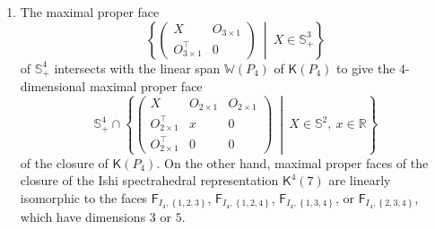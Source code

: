 \documentclass[oneside]{amsart}
\theoremstyle{plain}
\theoremstyle{definition}
\theoremstyle{remark}
\numberwithin{equation}{section}
\begin{document}
\begin{enumerate}[label=(\roman*)]
\item The maximal proper face
\[
\left\{
\begin{pmatrix}
X & O_{3 \times 1}
\\
O_{3 \times 1}^{\top} & 0
\end{pmatrix}
\ \middle|\ X \in \mathbb{S}^{3}_{+}\right\}
\]
of $\mathbb{S}^{4}_{+}$ intersects with the linear span $\mathbb{W}(P_{4})$
of $\mathsf{K}(P_{4})$ to give the $4$-dimensional maximal proper face
\[
\mathbb{S}^{4}_{+} \cap \left\{
\begin{pmatrix}
X & O_{2 \times 1} & O_{2 \times 1}
\\
O_{2 \times 1}^{\top} & x & 0
\\
O_{2 \times 1}^{\top} & 0 & 0
\end{pmatrix}
\ \middle|\ X \in \mathbb{S}^{2}, \ x \in \mathbb{R}\right\}
\]
of the closure of $\mathsf{K}(P_{4})$. On the other hand, maximal proper
faces of the closure of the Ishi spectrahedral representation
$\mathsf{K}^{4}(7)$ are linearly isomorphic to the faces
$\mathsf{F}_{I_{4},\left\{1, 2, 3\right\}}$, $\mathsf{F}_{I_{4},\left\{1,
2, 4\right\}}$, $\mathsf{F}_{I_{4},\left\{1, 3, 4\right\}}$, or
$\mathsf{F}_{I_{4},\left\{2, 3, 4\right\}}$, which have dimensions $3$ or
$5$.


\end{enumerate}
\end{document}
